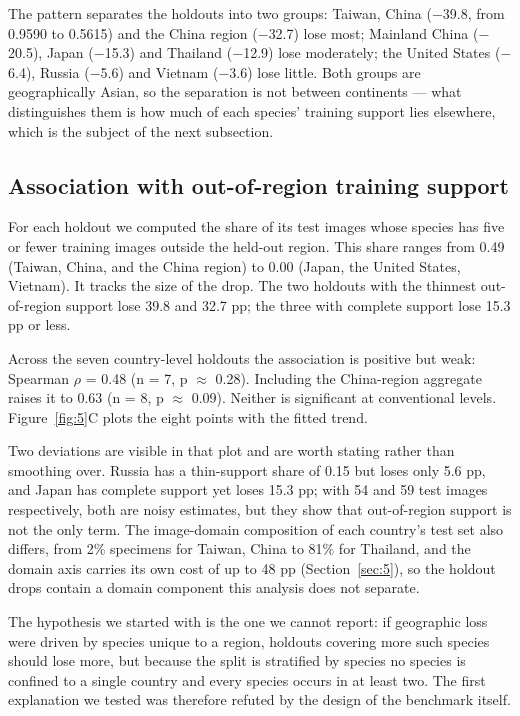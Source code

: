 \documentclass[preprint,12pt,authoryear]{elsarticle}
\begin{document}
The pattern separates the holdouts into two groups: Taiwan, China ($-$39.8, from 0.9590 to 0.5615) and the China region ($-$32.7) lose most; Mainland China ($-$20.5), Japan ($-$15.3) and Thailand ($-$12.9) lose moderately; the United States ($-$6.4), Russia ($-$5.6) and Vietnam ($-$3.6) lose little. Both groups are geographically Asian, so the separation is not between continents --- what distinguishes them is how much of each species' training support lies elsewhere, which is the subject of the next subsection.

\setcounter{section}{6}

\setcounter{subsection}{2}

\subsection{Association with out-of-region training support}\label{sec:6.3}

For each holdout we computed the share of its test images whose species has five or fewer training images outside the held-out region. This share ranges from 0.49 (Taiwan, China, and the China region) to 0.00 (Japan, the United States, Vietnam). It tracks the size of the drop. The two holdouts with the thinnest out-of-region support lose 39.8 and 32.7 pp; the three with complete support lose 15.3 pp or less.

Across the seven country-level holdouts the association is positive but weak: Spearman $\rho$ = 0.48 (n = 7, p $\approx$ 0.28). Including the China-region aggregate raises it to 0.63 (n = 8, p $\approx$ 0.09). Neither is significant at conventional levels. Figure~\ref{fig:5}C plots the eight points with the fitted trend.

Two deviations are visible in that plot and are worth stating rather than smoothing over. Russia has a thin-support share of 0.15 but loses only 5.6 pp, and Japan has complete support yet loses 15.3 pp; with 54 and 59 test images respectively, both are noisy estimates, but they show that out-of-region support is not the only term. The image-domain composition of each country's test set also differs, from 2\% specimens for Taiwan, China to 81\% for Thailand, and the domain axis carries its own cost of up to 48 pp (Section~\ref{sec:5}), so the holdout drops contain a domain component this analysis does not separate.

The hypothesis we started with is the one we cannot report: if geographic loss were driven by species unique to a region, holdouts covering more such species should lose more, but because the split is stratified by species no species is confined to a single country and every species occurs in at least two. The first explanation we tested was therefore refuted by the design of the benchmark itself.
\end{document}
